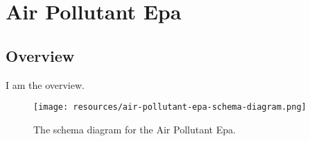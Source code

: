 
\section{Air Pollutant Epa}
\label{sec:air-pollutant-epa}
\subsection{Overview}
\label{ssec:overview}

I am the overview.

\begin{figure}[h!]
  \begin{center}
    \texttt{[image: resources/air-pollutant-epa-schema-diagram.png]}
  \end{center}
  \caption{The schema diagram for the Air Pollutant Epa.}
  \label{fig:ov-diagram}
\end{figure}



